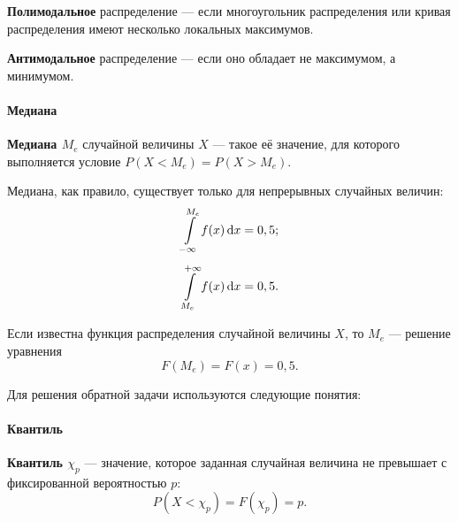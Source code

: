 \documentclass[a4paper]{article}
\newcommand{\key}[1]{{\color{Medium}\bfseries #1}}
\begin{document}
                    \key{Полимодальное} распределение --- если многоугольник распределения или кривая распределения имеют несколько локальных максимумов.
                        
                    \key{Антимодальное} распределение --- если оно обладает не максимумом, а минимумом.

                \paragraph{Медиана}

                    \key{Медиана \boldmath$M_e$} случайной величины $X$ --- такое её значение, для которого выполняется условие $P(X < M_e) = P(X > M_e)$.
                    
                    Медиана, как правило, существует только для непрерывных случайных величин:
                    \begin{equation*}
                        \begin{aligned}
                            \int\limits_{-\infty}^{M_e} f(x) \dif x &= 0,5 ; \\[1.0ex]
                            \int\limits_{M_e}^{+\infty} f(x) \dif x &= 0,5 .
                        \end{aligned}
                    \end{equation*}

                    Если известна функция распределения случайной величины $X$, то $M_e$ --- решение уравнения
                    \begin{equation*}
                        F(M_e) = F(x) = 0,5 .
                    \end{equation*}

                Для решения обратной задачи используются следующие понятия:

                \paragraph{Квантиль}

                    \key{Квантиль \boldmath$\chi_p$} --- значение, которое заданная случайная величина не превышает с фиксированной вероятностью $p$:
                    \begin{equation*}
                        P(X < \chi_p) = F(\chi_p) = p .
                    \end{equation*}
                    
\end{document}
